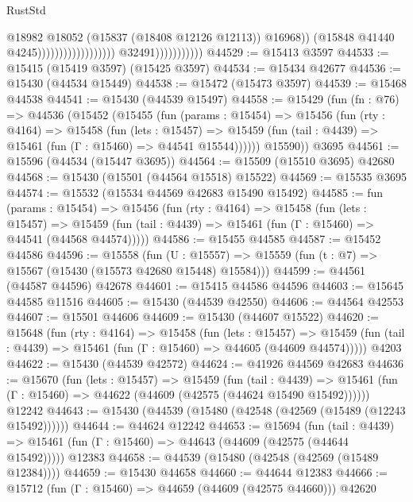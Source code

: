 \begin{lexlean}{RustStd}
\begin{coremodule}
{\begin{coremodule}
{{{{{{{{{{{{{{{{{{{{{{{{{{{{{{{{{{{{{{{{{{{{{{{{{{{{{{{{{{{{                                                                @18982
                                                                @18052
                                                                (@15837 (@18408 @12126 @12113))
                                                                @16968))
                                                            (@15848 @41440 @4245))))))))))))))))))
                          @32491)))))))))))
@44529 := @15413 @3597
@44533 := @15415 (@15419 @3597) (@15425 @3597)
@44534 := @15434 @42677
@44536 := @15430 (@44534 @15449)
@44538 := @15472 (@15473 @3597)
@44539 := @15468 @44538
@44541 := @15430 (@44539 @15497)
@44558 := @15429
    (fun (fn : @76) =>
    @44536
      (@15452
        (@15455
          (fun (params : @15454) =>
          @15456
            (fun (rty : @4164) =>
            @15458
              (fun (lets : @15457) =>
              @15459 (fun (tail : @4439) => @15461 (fun (Γ : @15460) => @44541 @15544))))))
        @15590))
    @3695
@44561 := @15596 (@44534 (@15447 @3695))
@44564 := @15509 (@15510 @3695) @42680
@44568 := @15430 (@15501 (@44564 @15518) @15522)
@44569 := @15535 @3695
@44574 := @15532 (@15534 @44569 @42683 @15490 @15492)
@44585 := fun (params : @15454) =>
  @15456
    (fun (rty : @4164) =>
    @15458
      (fun (lets : @15457) =>
      @15459 (fun (tail : @4439) => @15461 (fun (Γ : @15460) => @44541 (@44568 @44574)))))
@44586 := @15455 @44585
@44587 := @15452 @44586
@44596 := @15558
    (fun (U : @15557) => @15559 (fun (t : @7) => @15567 (@15430 (@15573 @42680 @15448) @15584)))
@44599 := @44561 (@44587 @44596) @42678
@44601 := @15415 @44586 @44596
@44603 := @15645 @44585 @11516
@44605 := @15430 (@44539 @42550)
@44606 := @44564 @42553
@44607 := @15501 @44606
@44609 := @15430 (@44607 @15522)
@44620 := @15648
    (fun (rty : @4164) =>
    @15458
      (fun (lets : @15457) =>
      @15459 (fun (tail : @4439) => @15461 (fun (Γ : @15460) => @44605 (@44609 @44574)))))
    @4203
@44622 := @15430 (@44539 @42572)
@44624 := @41926 @44569 @42683
@44636 := @15670
    (fun (lets : @15457) =>
    @15459
      (fun (tail : @4439) =>
      @15461 (fun (Γ : @15460) => @44622 (@44609 (@42575 (@44624 @15490 @15492))))))
    @12242
@44643 := @15430 (@44539 (@15480 (@42548 (@42569 (@15489 (@12243 @15492))))))
@44644 := @44624 @12242
@44653 := @15694
    (fun (tail : @4439) => @15461 (fun (Γ : @15460) => @44643 (@44609 (@42575 (@44644 @15492)))))
    @12383
@44658 := @44539 (@15480 (@42548 (@42569 (@15489 @12384))))
@44659 := @15430 @44658
@44660 := @44644 @12383
@44666 := @15712 (fun (Γ : @15460) => @44659 (@44609 (@42575 @44660))) @42620
}}}}}}}}}}}}}}}}}}}}}}}}}}}}}}}}}}}}}}}}}}}}}}}}}}}}}}}}}}}}
\end{coremodule}}
\end{coremodule}
\end{lexlean}
